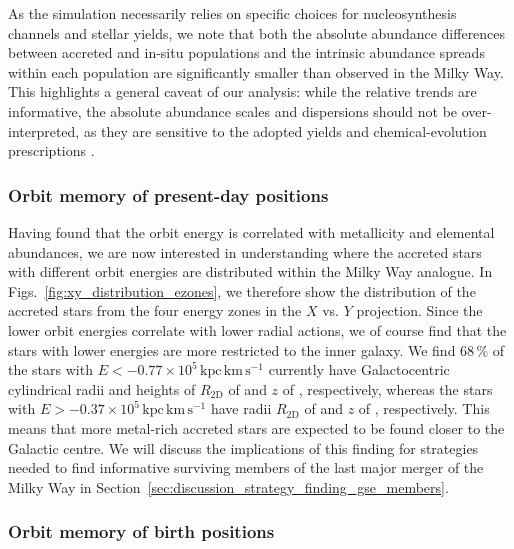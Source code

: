 \documentclass[fleqn,usenatbib]{mnras}
\begin{document}
As the simulation necessarily relies on specific choices for nucleosynthesis channels and stellar yields, we note that both the absolute abundance differences between accreted and in-situ populations and the intrinsic abundance spreads within each population are significantly smaller than observed in the Milky Way. This highlights a general caveat of our analysis: while the relative trends are informative, the absolute abundance scales and dispersions should not be over-interpreted, as they are sensitive to the adopted yields and chemical-evolution prescriptions \citep[see][for machine learning methods and model comparison approaches to select chemical enrichment models]{Buck2025,Guenes2025}.

\subsubsection{Orbit memory of present-day positions}

Having found that the orbit energy is correlated with metallicity and elemental abundances, we are now interested in understanding where the accreted stars with different orbit energies are distributed within the Milky Way analogue. In Figs.~\ref{fig:xy_distribution_ezones}, we therefore show the distribution of the accreted stars from the four energy zones in the $X$ vs. $Y$ projection. Since the lower orbit energies correlate with lower radial actions, we of course find that the stars with lower energies are more restricted to the inner galaxy. We find $68\,\mathrm{\%}$ of the stars with $E < -0.77\times10^5\,\mathrm{kpc\,km\,s^{-1}}$ currently have Galactocentric cylindrical radii and heights of $R_\mathrm{2D}$ of  and $z$ of , respectively, whereas the stars with $E > -0.37\times10^5\,\mathrm{kpc\,km\,s^{-1}}$ have radii $R_\mathrm{2D}$ of  and $z$ of , respectively. This means that more metal-rich accreted stars are expected to be found closer to the Galactic centre. We will discuss the implications of this finding for strategies needed to find informative surviving members of the last major merger of the Milky Way in Section~\ref{sec:discussion_strategy_finding_gse_members}.

\subsubsection{Orbit memory of birth positions}
\end{document}
